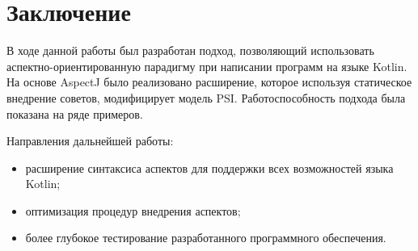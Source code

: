 \documentclass[conference]{IEEEtran}
\begin{document}

\section{Заключение}

В ходе данной работы был разработан подход, позволяющий использовать
аспектно-ориентированную парадигму при написании программ на языке Kotlin.
На основе AspectJ было реализовано расширение, которое используя статическое 
внедрение советов, модифицирует модель PSI.
Работоспособность подхода была показана на ряде примеров.

Направления дальнейшей работы:
\begin{itemize}
    \item расширение синтаксиса аспектов для поддержки всех возможностей языка
          Kotlin;
    \item оптимизация процедур внедрения аспектов;
    \item более глубокое тестирование разработанного программного обеспечения.
\end{itemize}


%
\end{document}
